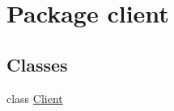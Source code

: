 \hypertarget{namespaceclient}{}\section{Package client}
\label{namespaceclient}
\subsection*{Classes}
\begin{DoxyCompactItemize}
\item 
class \hyperlink{classclient_1_1_client}{Client}
\end{DoxyCompactItemize}
